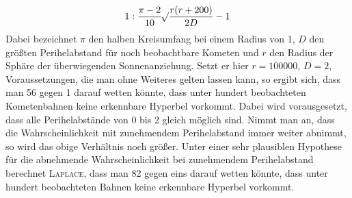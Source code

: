 \[1 : \frac{\pi-2}{10}\mathord{{}^{}\!\surd}\frac{r(r+200)}{2D} - 1\]
Dabei bezeichnet $\pi$ den halben Kreisumfang bei einem Radius von 1, $D$ den größten Perihelabstand für noch beobachtbare Kometen und $r$ den Radius der Sphäre der überwiegenden Sonnenanziehung. Setzt er hier $r = 100000$, $D = 2$, Voraussetzungen, die man ohne Weiteres gelten lassen kann, so ergibt sich, dass man 56 gegen 1 darauf wetten könnte, dass unter hundert beobachteten Kometenbahnen keine erkennbare Hyperbel vorkommt. Dabei wird vorausgesetzt, dass alle Perihelabstände von 0 bis 2 gleich möglich sind. Nimmt man an, dass die Wahrscheinlichkeit mit zunehmendem Perihelabstand immer weiter abnimmt, so wird das obige Verhältnis noch größer. Unter einer sehr plausiblen Hypothese für die abnehmende Wahrscheinlichkeit bei zunehmendem Perihelabstand berechnet \textsc{Laplace}, dass man 82 gegen eins darauf wetten könnte, dass unter hundert beobachteten Bahnen keine erkennbare Hyperbel vorkommt.

